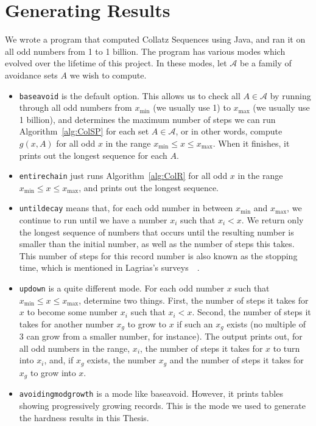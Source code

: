 \section{Generating Results} \label{subsec:algcomp}
We wrote a program that computed Collatz Sequences using Java, and ran it on all odd numbers from 1 to 1 billion. The program has various modes which evolved over the lifetime of this project. In these modes, let $\mathcal{A}$ be a family of avoidance sets $A$ we wish to compute.
\begin{itemize}
    \item {\tt baseavoid} is the default option. This allows us to check all $A \in \mathcal{A}$ by running through all odd numbers from $x_{\min}$ (we usually use 1) to $x_{\max}$ (we usually use 1 billion), and determines the maximum number of steps we can run Algorithm~\ref{alg:ColSP} for each set $A \in \mathcal{A}$, or in other words, compute $g(x,A)$ for all odd $x$ in the range $x_{\min} \leq x \leq x_{\max}$. When it finishes, it prints out the longest sequence for each $A$.
    \item {\tt entirechain} just runs Algorithm~\ref{alg:ColR} for all odd $x$ in the range $x_{\min} \leq x \leq x_{\max}$, and prints out the longest sequence.
    \item {\tt untildecay} means that, for each odd number in between $x_{\min}$ and $x_{\max}$, we continue to run until we have a number $x_i$ such that $x_i < x$. We return only the longest sequence of numbers that occurs until the resulting number is smaller than the initial number, as well as the number of steps this takes. This number of steps for this record number is also known as the stopping time, which is mentioned in Lagrias's surveys~\cite{2003mathLagrais}~\cite{2006mathLagrias}.
    \item {\tt updown} is a quite different mode. For each odd number $x$ such that $x_{\min}\leq x \leq x_{\max}$, determine two things. First, the number of steps it takes for $x$ to become some number $x_i$ such that $x_i < x$. Second, the number of steps it takes for another number $x_g$ to grow to $x$ if such an $x_g$ exists (no multiple of 3 can grow from a smaller number, for instance). The output prints out, for all odd numbers in the range, $x_i$, the number of steps it takes for $x$ to turn into $x_i$, and, if $x_g$ exists, the number $x_g$ and the number of steps it takes for $x_g$ to grow into $x$.
    \item {\tt avoidingmodgrowth} is a mode like baseavoid. However, it prints tables showing progressively growing records. This is the mode we used to generate the hardness results in this Thesis.
\end{itemize}

